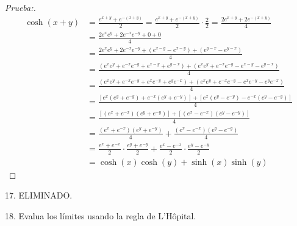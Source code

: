 \documentclass[12pt]{article}
\begin{document}
\begin{enumerate}[\hspace{9px} a)]
    \begin{proof}[Prueba:]
        \begin{align*}
            \cosh(x+y) &= \frac{e^{x+y}+e^{-(x+y)}}{2} = \frac{e^{x+y}+e^{-(x+y)}}{2}\cdot\frac{2}{2} = \frac{2e^{x+y}+2e^{-(x+y)}}{4}\\
            &= \frac{2e^xe^y+2e^{-x}e^{-y}+0+0}{4}\\
            &= \frac{2e^xe^y+2e^{-x}e^{-y}+(e^{x-y}-e^{x-y})+(e^{y-x}-e^{y-x})}{4}\\
            &= \frac{(e^xe^y+e^{-x}e^{-y}+e^{x-y}+e^{y-x})+(e^xe^y+e^{-x}e^{-y}-e^{x-y}-e^{y-x})}{4}\\
            &= \frac{(e^xe^y+e^{-x}e^{-y}+e^xe^{-y}+e^ye^{-x})+(e^xe^y+e^{-x}e^{-y}-e^xe^{-y}-e^ye^{-x})}{4}\\
            &= \frac{[e^x(e^y+e^{-y})+e^{-x}(e^y+e^{-y})]+[e^x(e^y-e^{-y})-e^{-x}(e^y-e^{-y})]}{4}\\
            &= \frac{[(e^x+e^{-x})(e^y+e^{-y})]+[(e^x-e^{-x})(e^y-e^{-y})]}{4}\\
            &= \frac{(e^x+e^{-x})(e^y+e^{-y})}{4}+\frac{(e^x-e^{-x})(e^y-e^{-y})}{4}\\
            &= \frac{e^x+e^{-x}}{2}\cdot\frac{e^y+e^{-y}}{2}+\frac{e^x-e^{-x}}{2}\cdot\frac{e^y-e^{-y}}{2}\\
            &= \cosh(x)\cosh(y)+\sinh(x)\sinh(y)
        \end{align*}
    \end{proof}

\end{enumerate}

17. ELIMINADO.\medskip

18. Evalua los l\'imites usando la regla de L'H\^opital.
\end{document}
